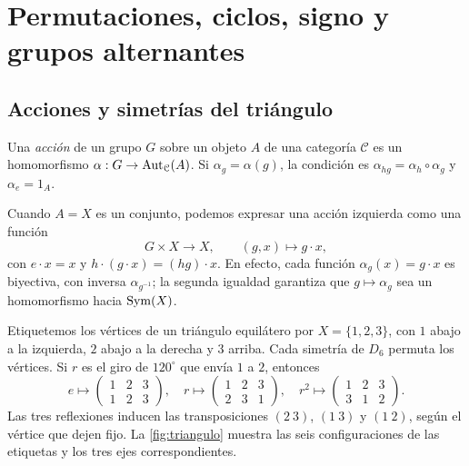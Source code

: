 \section{Permutaciones, ciclos, signo y grupos alternantes}\label{sec:grupos-permutaciones}

\subsection{Acciones y simetrías del triángulo}\label{tema:3-1-1b}
\begin{defi}
Una \emph{acción} de un grupo $G$ sobre un objeto $A$ de una categoría $\mathcal C$ es un homomorfismo $\alpha:G\to\operatorname{Aut}_{\mathcal C}(A)$. Si $\alpha_g=\alpha(g)$, la condición es $\alpha_{hg}=\alpha_h\circ\alpha_g$ y $\alpha_e=1_A$.
\end{defi}
Cuando $A=X$ es un conjunto, podemos expresar una acción izquierda como una función
\[
G\times X\to X,\qquad (g,x)\mapsto g\cdot x,
\]
con $e\cdot x=x$ y $h\cdot(g\cdot x)=(hg)\cdot x$. En efecto, cada función $\alpha_g(x)=g\cdot x$ es biyectiva, con inversa $\alpha_{g^{-1}}$; la segunda igualdad garantiza que $g\mapsto\alpha_g$ sea un homomorfismo hacia $\operatorname{Sym}(X)$.

\begin{ejem}
Etiquetemos los vértices de un triángulo equilátero por $X=\{1,2,3\}$, con $1$ abajo a la izquierda, $2$ abajo a la derecha y $3$ arriba. Cada simetría de $D_6$ permuta los vértices. Si $r$ es el giro de $120^\circ$ que envía $1$ a $2$, entonces
\[
e\longmapsto\begin{pmatrix}1&2&3\\1&2&3\end{pmatrix},\quad
r\longmapsto\begin{pmatrix}1&2&3\\2&3&1\end{pmatrix},\quad
r^2\longmapsto\begin{pmatrix}1&2&3\\3&1&2\end{pmatrix}.
\]
Las tres reflexiones inducen las transposiciones $(2\ 3)$, $(1\ 3)$ y $(1\ 2)$, según el vértice que dejen fijo. La \cref{fig:triangulo} muestra las seis configuraciones de las etiquetas y los tres ejes correspondientes.
\end{ejem}

